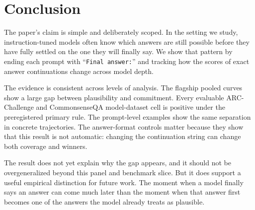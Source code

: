 \section{Conclusion}

The paper's claim is simple and deliberately scoped. In the setting we study,
instruction-tuned models often know which answers are still possible before they have fully
settled on the one they will finally say. We show that pattern by ending each prompt with
``\texttt{Final answer:}'' and tracking how the scores of exact answer continuations change
across model depth.

The evidence is consistent across levels of analysis. The flagship pooled curves show a large gap between plausibility and commitment. Every evaluable ARC-Challenge and CommonsenseQA model-dataset cell is positive under the preregistered primary rule. The prompt-level examples show the same separation in concrete trajectories. The answer-format controls matter because they show that this result is not automatic: changing the continuation string can change both coverage and winners.

The result does not yet explain why the gap appears, and it should not be overgeneralized beyond this panel and benchmark slice. But it does support a useful empirical distinction for future work. The moment when a model finally says an answer can come much later than the moment when that answer first becomes one of the answers the model already treats as plausible.
